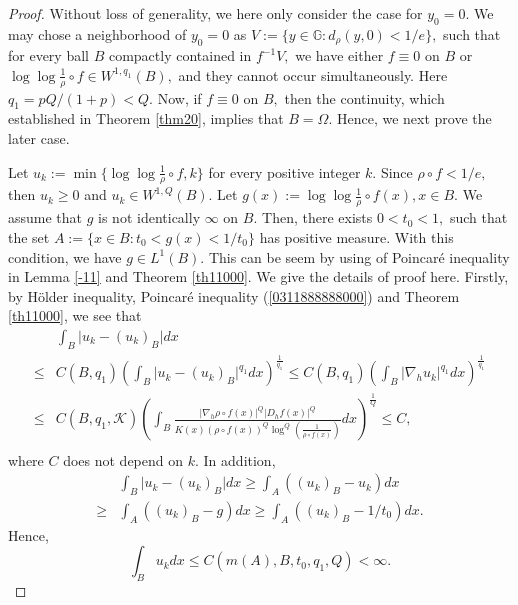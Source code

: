 \documentclass[11pt,twoside]{article}
\theoremstyle{definition}
\theoremstyle{remark}
\begin{document}
\begin{proof}
Without loss of generality, we here only consider the case for $y_{0}=0.$ We may chose a neighborhood of $y_{0}=0$  as $V:=\{y\in\mathbb{G}:d_{\rho}(y,0)<1/e\},$ such that for every ball $B$ compactly contained in $f^{-1}V,$  we have either $f\equiv 0$ on $B$ or $\log\log\frac{1}{\rho}\circ f\in W^{1,q_{1}}(B),$ and they cannot occur simultaneously. Here  $q_{1}=pQ/(1+p)<Q.$ Now, if $f\equiv 0$ on $B,$ then the continuity, which  established in Theorem \ref{thm20},
implies that $B=\Omega.$ Hence, we next prove the later case.

 Let $u_{k}:=\min\{\log\log\frac{1}{\rho}\circ  f,k\}$ for every positive integer $k.$ Since $\rho\circ f<1/e,$ then $u_{k}\geq0$ and $u_{k}\in W^{1,Q}(B).$  Let $g(x):=\log\log\frac{1}{\rho}\circ  f(x), x\in B.$ We assume that $g$ is not identically $\infty$ on $B.$ Then, there exists $0<t_{0}<1,$ such that the set $A:=\{x\in B:t_{0}<g(x)<1/t_{0}\}$ has positive  measure. With this condition, we have $g\in L^{1}(B).$ This can be seem by using of  Poincar\'{e} inequality in Lemma \ref{-11} and Theorem \ref{th11000}. We give the details of proof here. Firstly, by H\"{o}lder inequality, Poincar\'{e} inequality  (\ref{0311888888000}) and Theorem \ref{th11000}, we see that 
 \begin{equation}
\begin{aligned}
&\int_{B}\vert u_{k}-(u_{k})_{B}\vert dx\\
\leq& C(B,q_{1})\left(\int_{B}\vert u_{k}-(u_{k})_{B}\vert^{q_{1}} dx\right)^{\frac{1}{q_{1}}}\leq C(B,q_{1})\left(\int_{B}\vert \nabla_{h}u_{k}\vert^{q_{1}} dx\right)^{\frac{1}{q_{1}}}\\
\leq&C(B,q_{1},\mathcal{K})\left(\int_{B}\frac{\vert\nabla_{h}\rho\circ f(x)\vert^{Q}\vert D_{h}f(x)\vert^{Q}}{K(x)(\rho\circ f(x))^{Q}\log^{Q}(\frac{1}{\rho\circ f(x)})}dx\right)^{\frac{1}{Q}}\leq C,\\
\end{aligned}
\end{equation}
 where $C$ does not depend on $k.$ In addition, 
 \begin{equation}
\begin{aligned}
&\int_{B}\vert u_{k}-(u_{k})_{B}\vert dx\geq\int_{A}((u_{k})_{B}-u_{k} )dx\\
\geq&\int_{A}((u_{k})_{B}-g )dx\geq\int_{A}((u_{k})_{B}-1/t_{0} )dx.
\end{aligned}
\end{equation}
  Hence,
  $$\int_{B}u_{k}dx\leq C(m(A),B,t_{0},q_{1}, Q)<\infty.$$

\end{proof}
\end{document}
